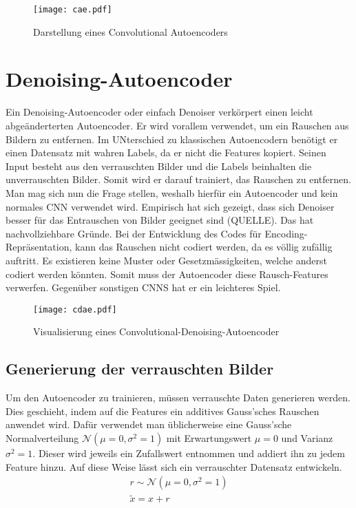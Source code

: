\begin{figure}[h!]
  \centering
  \texttt{[image: cae.pdf]}
  \caption{Darstellung eines Convolutional Autoencoders}
\end{figure}


\cite{yt:autoencoder_faces}

\section{Denoising-Autoencoder}
Ein Denoising-Autoencoder oder einfach Denoiser verkörpert einen leicht abgeänderterten
Autoencoder. Er wird vorallem verwendet, um ein Rauschen aus Bildern zu entfernen.
\para{}
Im UNterschied zu klassischen Autoencodern benötigt er einen Datensatz mit
wahren Labels, da er nicht die Features kopiert.
Seinen Input besteht aus den verrauschten Bilder und die Labels beinhalten die
unverrauschten Bilder. Somit wird er darauf trainiert, das Rauschen zu entfernen.
Man mag sich nun die Frage stellen, weshalb hierfür ein Autoencoder und
kein normales CNN verwendet wird. Empirisch hat sich gezeigt, dass sich
Denoiser besser für das Entrauschen von Bilder geeignet sind (QUELLE).
Das hat nachvollziehbare Gründe. Bei der
Entwicklung des Codes für Encoding-Repräsentation, kann das Rauschen nicht
codiert werden, da es völlig zufällig auftritt. Es existieren keine Muster oder
Gesetzmässigkeiten, welche anderst codiert werden könnten. Somit muss der
Autoencoder diese Rausch-Features verwerfen. Gegenüber sonstigen CNNS hat er ein leichteres Spiel.
\para{}
\begin{figure}[h!]
  \centering
  \texttt{[image: cdae.pdf]}
  \caption{Visualisierung eines Convolutional-Denoising-Autoencoder}
\end{figure}


\subsection{Generierung der verrauschten Bilder}
Um den Autoencoder zu trainieren, müssen verrauschte Daten generieren werden.
Dies geschieht, indem auf die Features ein additives Gauss'sches Rauschen
anwendet wird.
Dafür verwendet man üblicherweise eine Gauss'sche Normalverteilung
$\mathcal{N}(\mu = 0, \sigma^2 = 1)$ mit Erwartungswert $\mu = 0$ und Varianz
$\sigma^2 = 1$. Dieser wird jeweils ein Zufallswert entnommen und addiert ihn zu
jedem Feature hinzu.
Auf diese Weise lässt sich ein verrauschter Datensatz entwickeln.
\begin{gather*}
  r \sim \mathcal{N}(\mu = 0, \sigma^2 = 1) \\
  \tilde{x} = x + r
\end{gather*}


